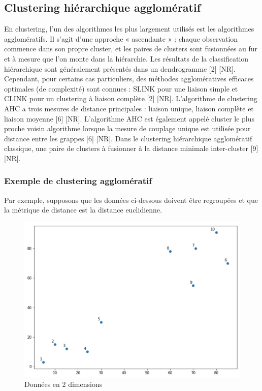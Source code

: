 \subsection{Clustering hiérarchique agglomératif}
En clustering, l'un des algorithmes les plus largement utilisés est les algorithmes agglomératifs. Il s'agit d'une approche « ascendante » : chaque observation commence dans son propre cluster, et les paires de clusters sont fusionnées au fur et à mesure que l'on monte dans la hiérarchie. Les résultats de la classification hiérarchique sont généralement présentés dans un dendrogramme [2] [NR].
Cependant, pour certains cas particuliers, des méthodes agglomératives efficaces optimales (de complexité) sont connues : SLINK pour une liaison simple et CLINK pour un clustering à liaison complète [2] [NR].
L’algorithme de clustering AHC a trois mesures de distance principales : liaison unique, liaison complète et liaison moyenne [6] [NR].
L’algorithme AHC est également appelé cluster le plus proche voisin algorithme lorsque la mesure de couplage unique est utilisée pour distance entre les grappes [6] [NR].
Dans le clustering hiérarchique agglomératif classique, une paire de clusters à fusionner à la distance minimale inter-cluster [9] [NR].

\subsubsection{Exemple de clustering agglomératif}

Par exemple, supposons que les données ci-dessous doivent être regroupées et que la métrique de distance est la distance euclidienne.
\begin{figure}[H]
	\begin{center}
		\includegraphics[width=\textwidth]{images/chapitre6/agglo_clustering.png}
	\end{center}
	\caption{Données en 2 dimensions}
	\label{agglo_clustering}
\end{figure}

